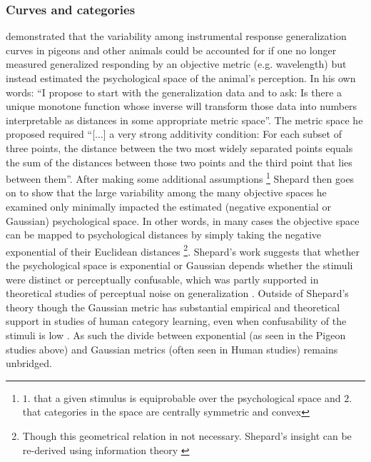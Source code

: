 \documentclass[doc,12pt]{apa}        %
\begin{document}
\subsubsection{Curves and categories}
\label{subsub:curves}
 demonstrated that the variability among instrumental response generalization curves in pigeons and other animals could be accounted for if one no longer measured generalized responding by an objective metric (e.g. wavelength) but instead estimated the psychological space of the animal's perception.  In his own words: ``I propose to start with the generalization data and to ask: Is there a unique monotone function whose inverse will transform those data into numbers interpretable as distances in some appropriate metric space''. The metric space he proposed required ``[...] a very strong additivity condition: For each subset of three points, the distance between the two most widely separated points equals the sum of the distances between those two points and the third point that lies between them''.  After making some additional assumptions
\footnote{
    $1.$ that a given stimulus is equiprobable over the psychological space and $2.$ that categories in the space are centrally symmetric and convex
} Shepard then goes on to show that the large variability among the many objective spaces he examined only minimally impacted the estimated (negative exponential or Gaussian) psychological space.  In other words, in many cases the objective space can be mapped to psychological distances by simply taking the negative exponential of their Euclidean distances
\footnote{
    Though this geometrical relation in not necessary.  Shepard's insight can be re-derived using information theory \cite{Chatera:2003p9103}}.  Shepard's work suggests that whether the psychological space is exponential or Gaussian depends whether the stimuli were distinct or perceptually confusable, which was partly supported in theoretical studies of perceptual noise on generalization \cite{Ennis:1988p9359}.  Outside of Shepard's theory though the Gaussian metric has substantial empirical and theoretical support in studies of human category learning, even when confusability of the stimuli is low \cite{Nosofsky:1985p9356,Medin:2012p9358}.  As such the divide between exponential (as seen in the Pigeon studies above) and Gaussian metrics (often seen in Human studies) remains unbridged.
\end{document}
